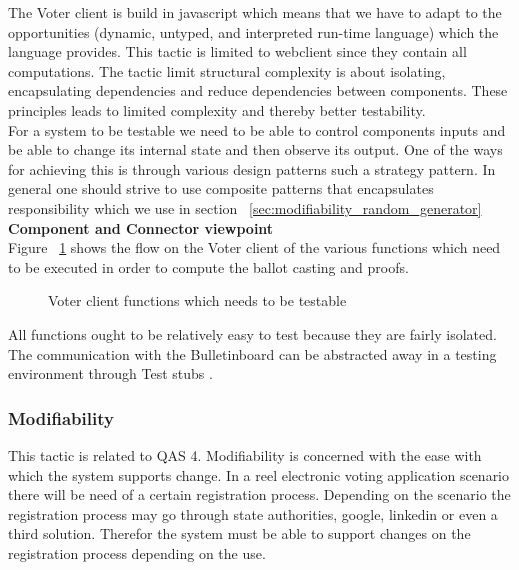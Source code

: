 \noindent
The Voter client is build in javascript which means that we have to adapt to the opportunities (dynamic, untyped, and interpreted run-time language) which the language provides. This tactic is limited to webclient since they contain all computations. The tactic limit structural complexity is about isolating, encapsulating dependencies and reduce dependencies between components. These principles leads to limited complexity and thereby better testability.   \\

\noindent
 For a system to be testable we need to be able to control components inputs and be able to change its internal state and then observe its output. One of the ways for achieving this is through various design patterns such a strategy pattern. In general one should strive to use composite patterns that encapsulates responsibility which we use in  section ~\ref{sec:modifiability_random_generator}  \\


\noindent
\textbf{Component and Connector viewpoint}\\
Figure ~\ref{fig:voterclient_functions_which_needs_to_be_testable}  shows the flow on the Voter client of the various functions which need to be executed in order to compute the ballot casting and proofs.

\begin{figure}[H]
\centering
  \caption{Voter client functions which needs to be testable}  
   \label{fig:voterclient_functions_which_needs_to_be_testable}
\end{figure}


\noindent
All functions ought to be relatively easy to test because they are fairly isolated. The communication with the Bulletinboard can be abstracted away in a testing environment through Test stubs \cite{Baerbak10}. 




\subsubsection{Modifiability}
This tactic is related to QAS 4. Modifiability is concerned with the ease with which the system supports change. In a reel electronic voting application scenario there will be need of a certain registration process. Depending on the scenario the registration process may go through state authorities, google, linkedin or even a third solution. Therefor the system must be able to support changes on the registration process depending on the use.  \\


